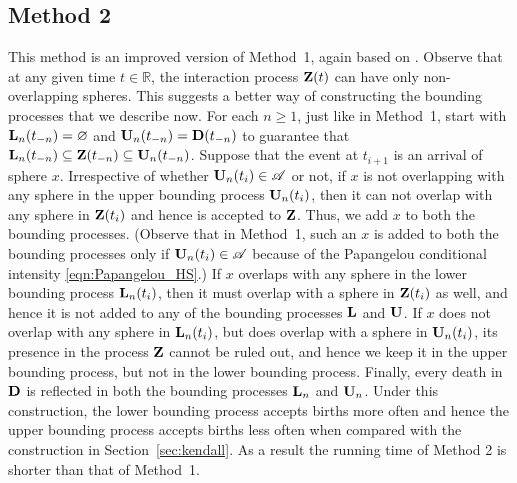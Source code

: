 \documentclass[11pt]{article}
\newcommand{\reals}{\mathbb{R}}
\newcommand{\lfs}{\mathbf{x}}
\begin{document}
\subsection{Method 2}
\label{sec:Alt-DCFTP}
This method is an improved version of Method~1, again based on \cite{KM00}. 
Observe that at any given time $t \in \reals$, the interaction process $\mathbf{Z}(t)$ can have only non-overlapping spheres. This suggests a better way of constructing the bounding processes that we describe now. For each $n \geq 1$, just like in Method~1, start with ${\mathbf{L}_n(t_{-n}) = \varnothing}$ and ${\mathbf{U}_n(t_{-n}) = \mathbf{D}(t_{-n})}$ to guarantee that ${\mathbf{L}_n(t_{-n}) \subseteq \mathbf{Z}(t_{-n}) \subseteq \mathbf{U}_n(t_{-n})}$. Suppose that the event at $t_{i+1}$ is an arrival of sphere $x$. Irrespective of whether $\mathbf{U}_n(t_i) \in \mathscr{A}$ or not, if $x$ is not overlapping with any sphere in the upper bounding process $\mathbf{U}_n(t_i)$, then it can not overlap with any sphere in $\mathbf{Z}(t_i)$ and hence is accepted to $\mathbf{Z}$. Thus, we add $x$ to both the bounding processes. (Observe that in Method~1, such an $x$ is added to both the bounding processes only if $\mathbf{U}_n(t_i) \in \mathscr{A}$ because of the Papangelou conditional intensity \eqref{eqn:Papangelou_HS}.) If $x$ overlaps with any sphere in the lower bounding process $\mathbf{L}_n(t_i)$, then it must overlap with a sphere in $\mathbf{Z}(t_i)$ as well, and hence it is not added to any of the bounding processes $\mathbf{L}$ and $\mathbf{U}$. If $x$ does not overlap with any sphere in $\mathbf{L}_n(t_i)$, but does overlap with a sphere in $\mathbf{U}_n(t_i)$, its presence in the process $\mathbf{Z}$ cannot be ruled out, and hence we keep it in the upper bounding process, but not in the lower bounding process. 
Finally, every death in $\mathbf{D}$ is reflected in both the bounding processes $\mathbf{L}_n$ and $\mathbf{U}_n$.
Under this construction, the lower bounding process accepts births more often and hence the upper bounding process accepts births less often when compared with the construction in Section~\ref{sec:kendall}. As a result the running time of Method 2 is shorter than that of Method~1.
\end{document}
